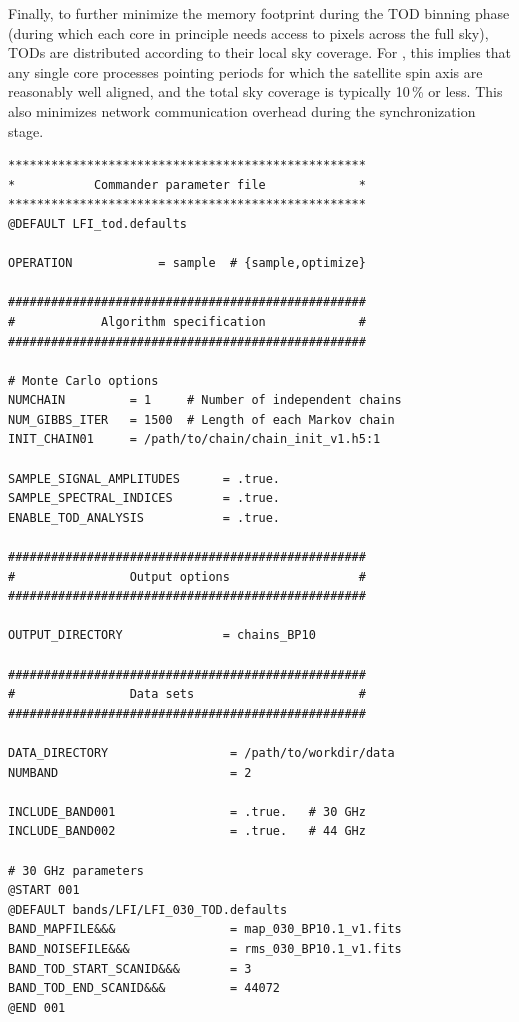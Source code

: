 \documentclass[twocolumn]{aa}
\begin{document}
Finally, to further minimize the memory footprint during the TOD
binning phase (during which each core in principle needs access to
pixels across the full sky), TODs are distributed according to their
local sky coverage. For \Planck, this implies that any single core
processes pointing periods for which the satellite spin axis are
reasonably well aligned, and the total sky coverage is typically
10\,\% or less. This also minimizes network communication overhead
during the synchronization stage.

\begin{lstfloat}[t]
  {\scriptsize
    \begin{tcolorbox}
\begin{lstlisting}
**************************************************
*           Commander parameter file             *
**************************************************
@DEFAULT LFI_tod.defaults

OPERATION            = sample  # {sample,optimize}

##################################################
#            Algorithm specification             #
##################################################

# Monte Carlo options
NUMCHAIN         = 1     # Number of independent chains
NUM_GIBBS_ITER   = 1500  # Length of each Markov chain
INIT_CHAIN01     = /path/to/chain/chain_init_v1.h5:1

SAMPLE_SIGNAL_AMPLITUDES      = .true.
SAMPLE_SPECTRAL_INDICES       = .true.
ENABLE_TOD_ANALYSIS           = .true.

##################################################
#                Output options                  #
##################################################

OUTPUT_DIRECTORY              = chains_BP10

##################################################
#                Data sets                       #
##################################################

DATA_DIRECTORY                 = /path/to/workdir/data
NUMBAND                        = 2

INCLUDE_BAND001                = .true.   # 30 GHz
INCLUDE_BAND002                = .true.   # 44 GHz

# 30 GHz parameters
@START 001
@DEFAULT bands/LFI/LFI_030_TOD.defaults
BAND_MAPFILE&&&                = map_030_BP10.1_v1.fits
BAND_NOISEFILE&&&              = rms_030_BP10.1_v1.fits
BAND_TOD_START_SCANID&&&       = 3
BAND_TOD_END_SCANID&&&         = 44072
@END 001


\end{lstlisting}
\end{tcolorbox}}
\end{lstfloat}
\end{document}
